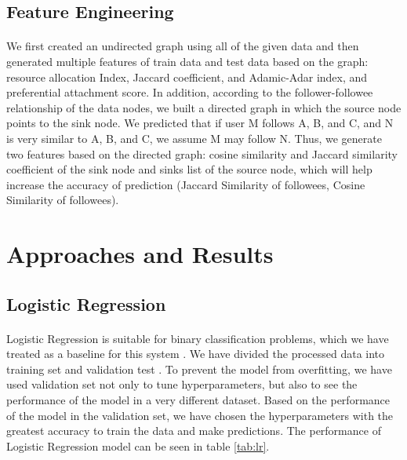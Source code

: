 \documentclass[fleqn,11pt]{olplainarticle}
\begin{document}
\subsection{Feature Engineering}\label{feature}
\paragraph*{}
We first created an undirected graph using all of the given data and then generated multiple features of train data and test data based on the graph: resource allocation Index, Jaccard coefficient, and Adamic-Adar index, and preferential attachment score. In addition, according to the follower-followee relationship of the data nodes, we built a directed graph in which the source node points to the sink node. We predicted that if user M follows A, B, and C, and N is very similar to A, B, and C, we assume M may follow N. Thus, we generate two features based on the directed graph: cosine similarity and Jaccard similarity coefficient of the sink node and sinks list of the source node, which will help increase the accuracy of prediction (Jaccard Similarity of followees, Cosine Similarity of followees).


\section{Approaches and Results}\label{appres}

\subsection{Logistic Regression}\label{lr}
\paragraph*{}
Logistic Regression is suitable for binary classification problems, which we have treated as a baseline for this system \citep{menard_lr}. We have divided the processed data into training set and validation test \citep{scikit-learn}. To prevent the model from overfitting, we have used validation set not only to tune hyperparameters, but also to see the performance of the model in a very different dataset. Based on the performance of the model in the validation set, we have chosen the hyperparameters with the greatest accuracy to train the data and make predictions. The performance of Logistic Regression model can be seen in table \ref{tab:lr}.
\end{document}
